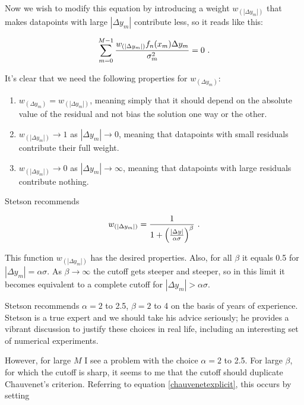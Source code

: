 \documentclass[psfig,preprint]{aastex}
\begin{document}
	Now we wish to modify this equation by introducing a weight
$w_{(|\Delta y_m|)}$ that makes datapoints with large $|\Delta y_m|$
contribute less, so it reads like this:

\begin{equation} \label{wgtmodone}
\sum_{m=0}^{M-1} { w_{(|\Delta y_m|)} f_n(x_m) \Delta y_m
\over \sigma_m^2} = 0 \ .
\end{equation}

\noindent It's clear that we need the following properties for 
$w_{(\Delta y_m)}$: \begin{enumerate}

	\item $w_{(\Delta y_m)} = w_{(|\Delta y_m|)}$, meaning simply that
it should depend on the absolute value of the residual and not bias the
solution one way or the other.

	\item $w_{(|\Delta y_m|)} \rightarrow 1$ as $|\Delta y_m|
\rightarrow 0$, meaning that datapoints with small residuals contribute their
full weight.

	\item $w_{(|\Delta y_m|)} \rightarrow 0$ as $|\Delta y_m|
\rightarrow \infty$, meaning that datapoints with large residuals contribute
nothing. \end{enumerate}

\noindent Stetson recommends 

\begin{equation} \label{stetsonwgteqn}
w_{(|\Delta y_m|)} = {1 \over 1 + 
	\left( |\Delta y| \over \alpha \sigma \right) ^\beta } \ .
\end{equation}

\noindent This function $w_{(|\Delta y_m|)}$ has the desired properties.
Also, for all $\beta$ it equals 0.5 for $|\Delta y_m| = \alpha \sigma$.
As $\beta \rightarrow \infty$ the cutoff gets steeper and steeper, so in
this limit it becomes equivalent to a complete cutoff for $|\Delta y_m|
> \alpha \sigma$.

	Stetson recommends $\alpha = 2$ to 2.5, $\beta = 2$ to 4 on the
basis of years of experience. Stetson is a true expert and we should
take his advice seriously; he provides a vibrant discussion to justify
these choices in real life, including an interesting set of numerical
experiments.

	However, for large $M$ I see a problem with the choice $\alpha =
2$ to 2.5. For large $\beta$, for which the cutoff is sharp, it seems to
me that the cutoff should duplicate Chauvenet's criterion. Referring to
equation \ref{chauvenetexplicit}, this occurs by setting 
\end{document}
